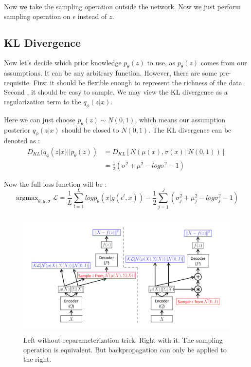 \documentclass{article}
\begin{document}
Now we take the sampling operation outside the network. Now we just perform sampling operation on $\epsilon$ instead of $z$.

\subsection{KL Divergence}
Now let's decide which prior knowledge $p_{\theta}(z)$ to use, as $p_{\theta}(z)$ comes from our assumptions. It can be any arbitrary function. However, there are some pre-requisite. First it should be flexible enough to represent the richness of the data. Second , it should be easy to sample. We may view the KL divergence as a regularization term to the $q_{\phi}(z|x)$.

Here we can just choose $p_{\theta}(z) \sim N(0,1)$, which means our assumption posterior $q_{\phi}(z|x)$ should be closed to $N(0,1)$. The KL divergence can be  denoted as :
\begin{align*}
D_{KL}(q_{\phi}(z|x)||p_{\theta}(z)) &=D_{KL}[N(\mu(x),\sigma(x)||N(0,1))] \\
&= \frac{1}{2}(\sigma^{2}+\mu^{2}-log\sigma^{2}-1)
\end{align*}

Now the full loss function will be :
$$\mathop{\arg\max}_{\theta,\mu,\sigma}\mathcal{L} =\frac{1}{L}\sum_{l=1}^{L}logp_{\theta}(x|g(\epsilon^{l},x)) -\frac{1}{2}\sum_{j=1}^{J}(\sigma_{j}^{2}+\mu_{j}^{2}-log\sigma_{j}^{2}-1)$$

\begin{figure}[h]
\centering
\includegraphics[width=5in,height=2.5in]{graph3}
\caption{Left without reparameterization trick. Right with it. The sampling operation is equivalent. But backpropagation can only be applied
to the right.\cite{DBLP:journals/corr/Doersch16}}
\end{figure}
 
\end{document}
